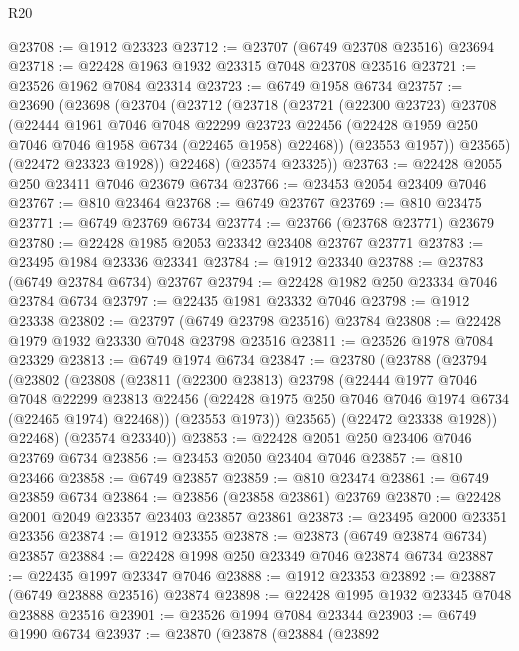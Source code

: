 \begin{lexlean}{R20}
\begin{coremodule}
{@23708 := @1912 @23323
@23712 := @23707 (@6749 @23708 @23516) @23694
@23718 := @22428 @1963 @1932 @23315 @7048 @23708 @23516
@23721 := @23526 @1962 @7084 @23314
@23723 := @6749 @1958 @6734
@23757 := @23690
    (@23698
      (@23704
        (@23712
          (@23718
            (@23721
              (@22300 @23723)
              @23708
              (@22444
                @1961
                @7046
                @7048
                @22299
                @23723
                @22456
                (@22428 @1959 @250 @7046 @7046 @1958 @6734 (@22465 @1958) @22468))
              (@23553 @1957))
            @23565)
          (@22472 @23323 @1928))
        @22468)
      (@23574 @23325))
@23763 := @22428 @2055 @250 @23411 @7046 @23679 @6734
@23766 := @23453 @2054 @23409 @7046
@23767 := @810 @23464
@23768 := @6749 @23767
@23769 := @810 @23475
@23771 := @6749 @23769 @6734
@23774 := @23766 (@23768 @23771) @23679
@23780 := @22428 @1985 @2053 @23342 @23408 @23767 @23771
@23783 := @23495 @1984 @23336 @23341
@23784 := @1912 @23340
@23788 := @23783 (@6749 @23784 @6734) @23767
@23794 := @22428 @1982 @250 @23334 @7046 @23784 @6734
@23797 := @22435 @1981 @23332 @7046
@23798 := @1912 @23338
@23802 := @23797 (@6749 @23798 @23516) @23784
@23808 := @22428 @1979 @1932 @23330 @7048 @23798 @23516
@23811 := @23526 @1978 @7084 @23329
@23813 := @6749 @1974 @6734
@23847 := @23780
    (@23788
      (@23794
        (@23802
          (@23808
            (@23811
              (@22300 @23813)
              @23798
              (@22444
                @1977
                @7046
                @7048
                @22299
                @23813
                @22456
                (@22428 @1975 @250 @7046 @7046 @1974 @6734 (@22465 @1974) @22468))
              (@23553 @1973))
            @23565)
          (@22472 @23338 @1928))
        @22468)
      (@23574 @23340))
@23853 := @22428 @2051 @250 @23406 @7046 @23769 @6734
@23856 := @23453 @2050 @23404 @7046
@23857 := @810 @23466
@23858 := @6749 @23857
@23859 := @810 @23474
@23861 := @6749 @23859 @6734
@23864 := @23856 (@23858 @23861) @23769
@23870 := @22428 @2001 @2049 @23357 @23403 @23857 @23861
@23873 := @23495 @2000 @23351 @23356
@23874 := @1912 @23355
@23878 := @23873 (@6749 @23874 @6734) @23857
@23884 := @22428 @1998 @250 @23349 @7046 @23874 @6734
@23887 := @22435 @1997 @23347 @7046
@23888 := @1912 @23353
@23892 := @23887 (@6749 @23888 @23516) @23874
@23898 := @22428 @1995 @1932 @23345 @7048 @23888 @23516
@23901 := @23526 @1994 @7084 @23344
@23903 := @6749 @1990 @6734
@23937 := @23870
    (@23878
      (@23884
        (@23892
}
\end{coremodule}
\end{lexlean}
